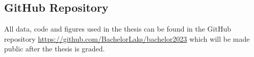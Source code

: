 \addappendix
\subsection*{GitHub Repository}\label{subsec:github}
All data, code and figures used in the thesis can be found in the GitHub repository \url{https://github.com/BachelorLaks/bachelor2023} which will be made public after the thesis is graded. 